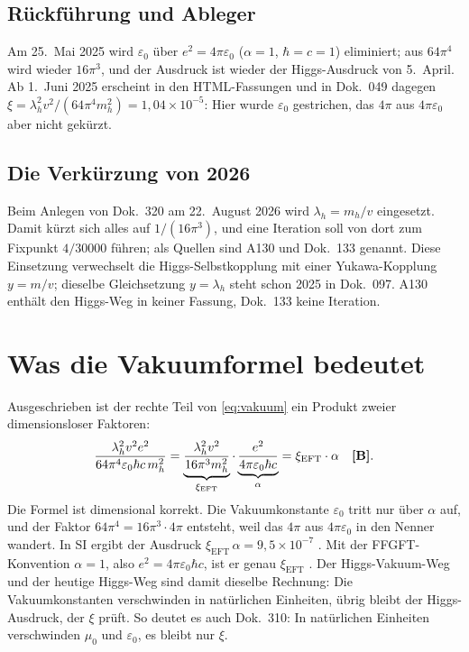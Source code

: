 \subsection{Rückführung und Ableger}

Am 25.~Mai 2025 wird $\varepsilon_0$ über $e^2=4\pi\varepsilon_0$ ($\alpha=1$, $\hbar=c=1$)
eliminiert; aus $64\pi^4$ wird wieder $16\pi^3$, und der Ausdruck ist wieder der Higgs-Ausdruck
von 5.~April. Ab 1.~Juni 2025 erscheint in den HTML-Fassungen und in Dok.~049 dagegen
$\xi=\lambda_h^2v^2/(64\pi^4m_h^2)=1{,}04\times10^{-5}$: Hier wurde $\varepsilon_0$ gestrichen,
das $4\pi$ aus $4\pi\varepsilon_0$ aber nicht gekürzt.

\subsection{Die Verkürzung von 2026}

Beim Anlegen von Dok.~320 am 22.~August 2026 wird $\lambda_h=m_h/v$ eingesetzt. Damit kürzt sich
alles auf $1/(16\pi^3)$, und eine Iteration soll von dort zum Fixpunkt $4/30000$ führen; als
Quellen sind A130 und Dok.~133 genannt. Diese Einsetzung verwechselt die Higgs-Selbstkopplung mit
einer Yukawa-Kopplung $y=m/v$; dieselbe Gleichsetzung $y=\lambda_h$ steht schon 2025 in
Dok.~097. A130 enthält den Higgs-Weg in keiner Fassung, Dok.~133 keine Iteration.

\section{Was die Vakuumformel bedeutet}

Ausgeschrieben ist der rechte Teil von \eqref{eq:vakuum} ein Produkt zweier dimensionsloser
Faktoren:
\begin{equation}
  \frac{\lambda_h^2v^2e^2}{64\pi^4\varepsilon_0\hbar c\,m_h^2}
  =\underbrace{\frac{\lambda_h^2v^2}{16\pi^3m_h^2}}_{\xi_{\text{EFT}}}\cdot
   \underbrace{\frac{e^2}{4\pi\varepsilon_0\hbar c}}_{\alpha}
  =\xi_{\text{EFT}}\cdot\alpha\quad\textbf{[B]} .
\end{equation}
Die Formel ist dimensional korrekt. Die Vakuumkonstante $\varepsilon_0$ tritt nur über $\alpha$
auf, und der Faktor $64\pi^4=16\pi^3\cdot4\pi$ entsteht, weil das $4\pi$ aus $4\pi\varepsilon_0$
in den Nenner wandert. In SI ergibt der Ausdruck $\xi_{\text{EFT}}\,\alpha=9{,}5\times10^{-7}$
\KM. Mit der FFGFT-Konvention $\alpha=1$, also $e^2=4\pi\varepsilon_0\hbar c$, ist er genau
$\xi_{\text{EFT}}$ \BM. Der Higgs-Vakuum-Weg und der heutige Higgs-Weg sind damit dieselbe
Rechnung: Die Vakuumkonstanten verschwinden in natürlichen Einheiten, übrig bleibt der
Higgs-Ausdruck, der $\xi$ prüft. So deutet es auch Dok.~310: In natürlichen Einheiten
verschwinden $\mu_0$ und $\varepsilon_0$, es bleibt nur $\xi$.

